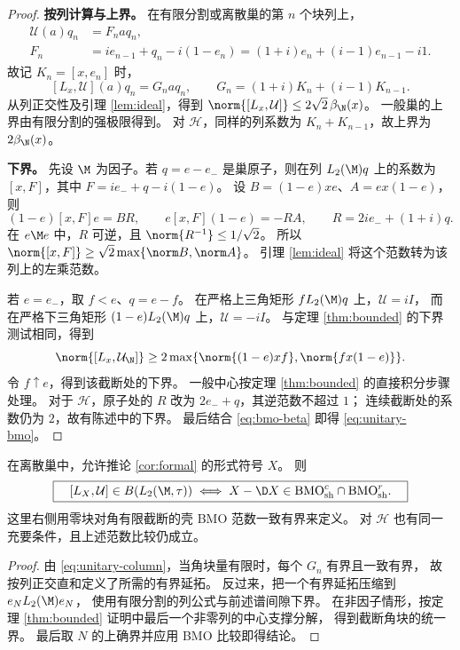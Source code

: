 \begin{proof}
\textbf{按列计算与上界。}
在有限分割或离散巢的第 $n$ 个块列上，
\begin{align*}
 \mathcal U(a)q_n&=F_na q_n,\\
 F_n&=i e_{n-1}+q_n-i(1-e_n)
       =(1+i)e_n+(i-1)e_{n-1}-i1.
\end{align*}
故记 $K_n=[x,e_n]$ 时，
\begin{equation}\label{eq:unitary-column}
 [L_x,\mathcal U](a)q_n
 =G_na q_n,\qquad G_n=(1+i)K_n+(i-1)K_{n-1}.
\end{equation}
从列正交性及引理 \ref{lem:ideal}，得到
$\norm{[L_x,\mathcal U]}\leq2\sqrt2\,\beta_\N(x)$。
一般巢的上界由有限分割的强极限得到。
对 $\mathcal H$，同样的列系数为 $K_n+K_{n-1}$，故上界为 $2\beta_\N(x)$。

\medskip
\textbf{下界。}
先设 $\M$ 为因子。若 $q=e-e_-$ 是巢原子，则在列 $L_2(\M)q$ 上的系数为
$[x,F]$，其中 $F=i e_-+q-i(1-e)$。
设 $B=(1-e)xe$、$A=ex(1-e)$，则
\[
 (1-e)[x,F]e=BR,\qquad e[x,F](1-e)=-RA,
 \qquad R=2i e_-+(1+i)q.
\]
在 $e\M e$ 中，$R$ 可逆，且 $\norm{R^{-1}}\leq1/\sqrt2$。
所以 $\norm{[x,F]}\geq\sqrt2\max\{\norm B,\norm A\}$。
引理 \ref{lem:ideal} 将这个范数转为该列上的左乘范数。

若 $e=e_-$，取 $f<e$、$q=e-f$。
在严格上三角矩形 $fL_2(\M)q$ 上，$\mathcal U=iI$，
而在严格下三角矩形 $(1-e)L_2(\M)q$ 上，$\mathcal U=-iI$。
与定理 \ref{thm:bounded} 的下界测试相同，得到
\[
 \norm{[L_x,\mathcal U_\N]}
 \geq2\max\{\norm{(1-e)xf},\norm{fx(1-e)}\}.
\]
令 $f\uparrow e$，得到该截断处的下界。
一般中心按定理 \ref{thm:bounded} 的直接积分步骤处理。
对于 $\mathcal H$，原子处的 $R$ 改为 $2e_-+q$，其逆范数不超过 $1$；
连续截断处的系数仍为 $2$，故有陈述中的下界。
最后结合 \eqref{eq:bmo-beta} 即得 \eqref{eq:unitary-bmo}。
\end{proof}

\begin{corollary}\label{cor:unitary-formal}
在离散巢中，允许推论 \ref{cor:formal} 的形式符号 $X$。
则
\[
 \boxed{\quad
 [L_X,\mathcal U]\in B(L_2(\M,\tau))
 \iff X-\D X\in\mathrm{BMO}_{\rm sh}^c\cap\mathrm{BMO}_{\rm sh}^r.
 \quad}
\]
这里右侧用零块对角有限截断的壳 BMO 范数一致有界来定义。
对 $\mathcal H$ 也有同一充要条件，且上述范数比较仍成立。
\end{corollary}

\begin{proof}
由 \eqref{eq:unitary-column}，当角块量有限时，每个 $G_n$ 有界且一致有界，
故按列正交直和定义了所需的有界延拓。
反过来，把一个有界延拓压缩到 $e_NL_2(\M)e_N$，
使用有限分割的列公式与前述谱间隙下界。
在非因子情形，按定理 \ref{thm:bounded} 证明中最后一个非零列的中心支撑分解，
得到截断角块的统一界。
最后取 $N$ 的上确界并应用 BMO 比较即得结论。
\end{proof}

